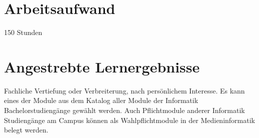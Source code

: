 \section*{Arbeitsaufwand\label{/mi-2017/modulbeschreibungen-bachelor/BA_WPF}}\label{arbeitsaufwandpathlabelmi-2017modulbeschreibungen-bachelorbaux5fwpf}

150 Stunden

\section*{Angestrebte
Lernergebnisse\label{/mi-2017/modulbeschreibungen-bachelor/BA_WPF}}\label{angestrebte-lernergebnissepathlabelmi-2017modulbeschreibungen-bachelorbaux5fwpf}

Fachliche Vertiefung oder Verbreiterung, nach persönlichem Interesse. Es
kann eines der Module aus dem Katalog aller Module der Informatik
Bachelorstudiengänge gewählt werden. Auch Pflichtmodule anderer
Informatik Studiengänge am Campus können als Wahlpflichtmodule in der
Medieninformatik belegt werden.

